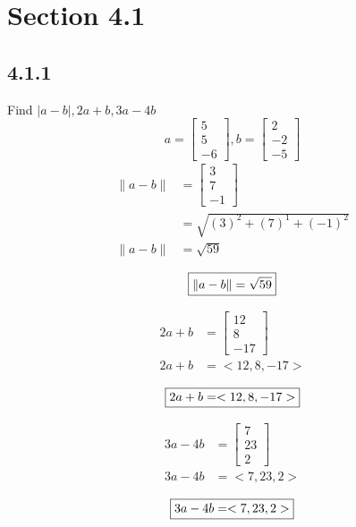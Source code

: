 \documentclass{article}
\begin{document}
\newcommand{\hr}{\par\noindent\rule{\textwidth}{0.4pt}}

\newcommand{\bc}[1]{
	\begin{equation*}
		\begin{boxed}
			{#1}
		\end{boxed}
	\end{equation*}
}

\newcommand{\cond}[2]{
	\ifmmode
		{#1} \quad {#2}
	\else
		$$ {#1} \quad {#2} $$
	\fi
}

\tableofcontents

\section{Section 4.1}

\subsection{4.1.1}
Find $ |a - b|, 2a + b, 3a - 4b $
\begin{equation*}
	a =
		\begin{bmatrix}
			5 \\
			5 \\
			-6
		\end{bmatrix},
	b =
		\begin{bmatrix}
			2 \\
			-2 \\
			-5
		\end{bmatrix}
\end{equation*}
\begin{align*}
	\|a - b\| & =
		\begin{bmatrix}
			3 \\
			7 \\
			-1
		\end{bmatrix} \\
			  & = \sqrt{(3)^2 + (7)^1 + (-1)^2} \\
	\|a - b\| & = \sqrt{59}
\end{align*}
\bc{\|a - b\| = \sqrt{59}}
\begin{align*}
	2a + b & =
		\begin{bmatrix}
			12 \\
			8 \\
			-17
		\end{bmatrix} \\
	2a + b & = <12,8,-17>
\end{align*}
\bc{2a + b = <12,8,-17>}
\begin{align*}
	3a - 4b & =
		\begin{bmatrix}
			7 \\
			23 \\
			2
		\end{bmatrix} \\
	3a - 4b & = <7,23,2>
\end{align*}
\bc{3a - 4b = <7,23,2>}
\end{document}
